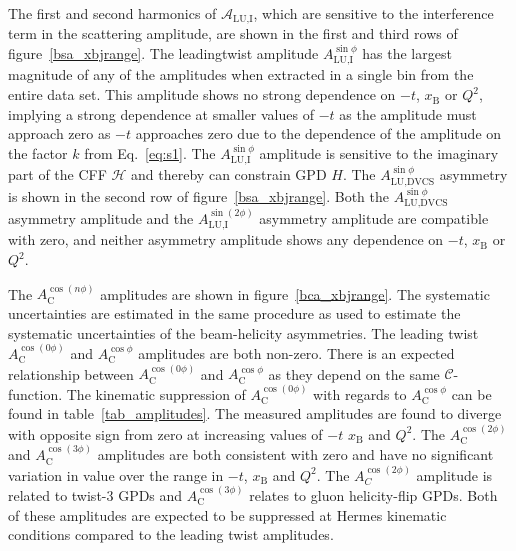 The first and second harmonics of $\mathcal{A}_{\textrm{LU,I}}$, which are
sensitive to the interference term in the scattering amplitude, are shown in the first and third rows of figure~\ref{bsa_xbjrange}. The leading\red{-}twist amplitude $A_{\textrm{LU,I}}^{\sin\phi}$ has the largest magnitude of any of the amplitudes when extracted in a single bin from the entire data set. This amplitude shows no strong dependence on $-t$, $x_{\textrm{B}}$ or $Q^{2}$, implying a strong dependence at smaller values of $-t$ as the amplitude must approach zero as $-t$ approaches zero due to the dependence of the amplitude on the factor $k$ from Eq.~\ref{eq:s1}. The $A_{\textrm{LU,I}}^{\sin\phi}$ amplitude is sensitive to the imaginary part of the CFF $\mathcal{H}$ and thereby can constrain GPD $\textit{H}$. The $A_{\textrm{LU,DVCS}}^{\sin\phi}$ asymmetry is shown in the second row of figure~\ref{bsa_xbjrange}. Both the $A_{\textrm{LU,DVCS}}^{\sin\phi}$ asymmetry amplitude and the $A_{\textrm{LU,I}}^{\sin(2\phi)}$ asymmetry amplitude are compatible with zero, and neither asymmetry amplitude shows any dependence on $-t$, $x_{\textrm{B}}$ or $Q^{2}$.

The $A_{\textrm{C}}^{\cos(n\phi)}$ amplitudes are shown in figure~\ref{bca_xbjrange}. The systematic uncertainties are estimated in the same procedure as used to estimate the systematic uncertainties of the beam-helicity asymmetries. The leading twist $A_{\textrm{C}}^{\cos(0\phi)}$ and $A_{\textrm{C}}^{\cos\phi}$ amplitudes are both non-zero. There is an expected relationship between $A_{\textrm{C}}^{\cos(0\phi)}$ and $A_{\textrm{C}}^{\cos\phi}$ as they depend on the same $\mathcal{C}$-function. The kinematic suppression of $A_{\textrm{C}}^{\cos(0\phi)}$ with regards to $A_{\textrm{C}}^{\cos\phi}$ can be found in table~\ref{tab_amplitudes}. The measured amplitudes are found to diverge with opposite sign from zero at increasing values of $-t$  $x_{\textrm{B}}$ and $Q^{2}$. The $A_{\textrm{C}}^{\cos(2\phi)}$ and $A_{\textrm{C}}^{\cos(3\phi)}$ amplitudes are both consistent with zero and have no significant variation in value over the range in $-t$, $x_{\textrm{B}}$ and $Q^{2}$. The $A_{C}^{\cos(2\phi)}$ amplitude is related to twist-3 GPDs and $A_{\textrm{C}}^{\cos(3\phi)}$ relates to gluon helicity-flip GPDs. Both of these amplitudes are expected to be suppressed at H{\sc ermes} kinematic conditions compared to the leading twist amplitudes. 

